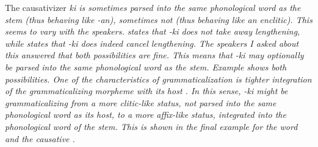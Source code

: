The causativizer \em ki\ng \em \label{page:phon:king} is sometimes parsed into the same phonological word as the stem (thus behaving like \em -an\em), sometimes not (thus behaving like an enclitic). This seems to vary with the speakers. \citet{Bichsel} states that \em -ki\ng{} \em does not take away lengthening, while \citet{Tapovanaye1995} states that \em -ki\ng{} \em does indeed cancel lengthening. The speakers I asked about this answered that both possibilities are fine. This means that \em -ki\ng{} \em may optionally be parsed into the same phonological word as the stem. Example  shows both possibilities. One of the characteristics of grammaticalization is tighter integration of the grammaticalizing morpheme with its host \citep[140ff]{HopperTraugott2003}. In this sense, \em -ki\ng{} \em might be grammaticalizing from a more clitic-like status, not parsed into the same phonological word as its host, to a more affix-like status, integrated into the phonological word of the stem. This is shown in the final example for the word  and the causative .

